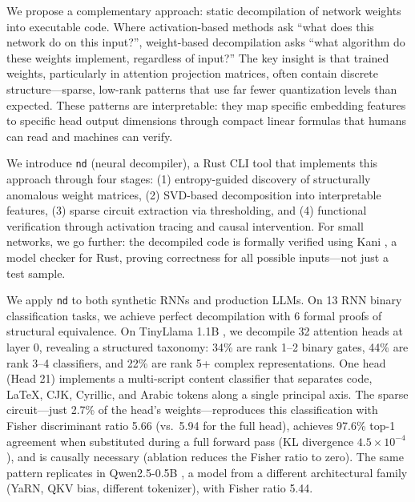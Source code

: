\documentclass[11pt]{article}
\begin{document}
We propose a complementary approach: static decompilation of network weights into executable code. Where activation-based methods ask ``what does this network do on this input?'', weight-based decompilation asks ``what algorithm do these weights implement, regardless of input?'' The key insight is that trained weights, particularly in attention projection matrices, often contain discrete structure---sparse, low-rank patterns that use far fewer quantization levels than expected. These patterns are interpretable: they map specific embedding features to specific head output dimensions through compact linear formulas that humans can read and machines can verify.

We introduce \texttt{nd} (neural decompiler), a Rust CLI tool that implements this approach through four stages: (1) entropy-guided discovery of structurally anomalous weight matrices, (2) SVD-based decomposition into interpretable features, (3) sparse circuit extraction via thresholding, and (4) functional verification through activation tracing and causal intervention. For small networks, we go further: the decompiled code is formally verified using Kani \cite{kani}, a model checker for Rust, proving correctness for all possible inputs---not just a test sample.

We apply \texttt{nd} to both synthetic RNNs and production LLMs. On 13 RNN binary classification tasks, we achieve perfect decompilation with 6 formal proofs of structural equivalence. On TinyLlama 1.1B \cite{tinyllama}, we decompile 32 attention heads at layer 0, revealing a structured taxonomy: 34\% are rank 1--2 binary gates, 44\% are rank 3--4 classifiers, and 22\% are rank 5+ complex representations. One head (Head 21) implements a multi-script content classifier that separates code, LaTeX, CJK, Cyrillic, and Arabic tokens along a single principal axis. The sparse circuit---just 2.7\% of the head's weights---reproduces this classification with Fisher discriminant ratio 5.66 (vs.\ 5.94 for the full head), achieves 97.6\% top-1 agreement when substituted during a full forward pass (KL divergence $4.5 \times 10^{-4}$), and is causally necessary (ablation reduces the Fisher ratio to zero). The same pattern replicates in Qwen2.5-0.5B \cite{qwen25}, a model from a different architectural family (YaRN, QKV bias, different tokenizer), with Fisher ratio 5.44.
\end{document}
